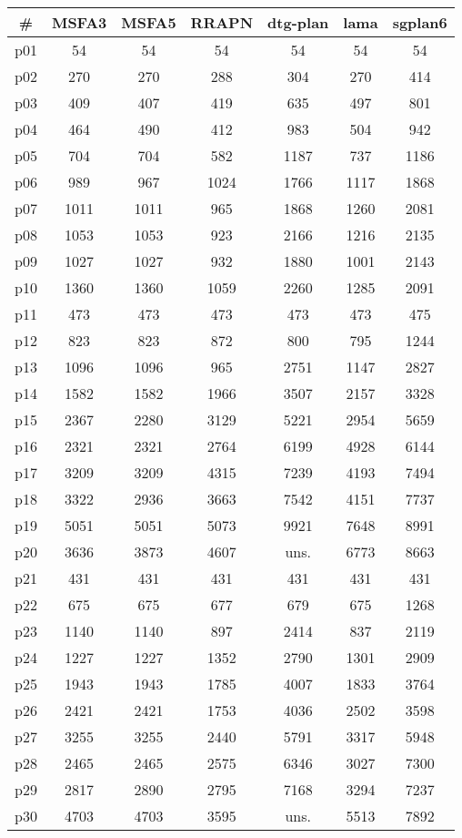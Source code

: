 \begin{tabular}{ccccccc}
\toprule
\textbf{\#} & \textbf{MSFA3} & \textbf{MSFA5} & \textbf{RRAPN} & \textbf{dtg-plan} & \textbf{lama} & \textbf{sgplan6}\\
\midrule
p01 & 54 & 54 & 54 & 54 & 54 & 54\\
p02 & 270 & 270 & 288 & 304 & 270 & 414\\
p03 & 409 & 407 & 419 & 635 & 497 & 801\\
p04 & 464 & 490 & 412 & 983 & 504 & 942\\
p05 & 704 & 704 & 582 & 1187 & 737 & 1186\\
p06 & 989 & 967 & 1024 & 1766 & 1117 & 1868\\
p07 & 1011 & 1011 & 965 & 1868 & 1260 & 2081\\
p08 & 1053 & 1053 & 923 & 2166 & 1216 & 2135\\
p09 & 1027 & 1027 & 932 & 1880 & 1001 & 2143\\
p10 & 1360 & 1360 & 1059 & 2260 & 1285 & 2091\\
p11 & 473 & 473 & 473 & 473 & 473 & 475\\
p12 & 823 & 823 & 872 & 800 & 795 & 1244\\
p13 & 1096 & 1096 & 965 & 2751 & 1147 & 2827\\
p14 & 1582 & 1582 & 1966 & 3507 & 2157 & 3328\\
p15 & 2367 & 2280 & 3129 & 5221 & 2954 & 5659\\
p16 & 2321 & 2321 & 2764 & 6199 & 4928 & 6144\\
p17 & 3209 & 3209 & 4315 & 7239 & 4193 & 7494\\
p18 & 3322 & 2936 & 3663 & 7542 & 4151 & 7737\\
p19 & 5051 & 5051 & 5073 & 9921 & 7648 & 8991\\
p20 & 3636 & 3873 & 4607 & uns. & 6773 & 8663\\
p21 & 431 & 431 & 431 & 431 & 431 & 431\\
p22 & 675 & 675 & 677 & 679 & 675 & 1268\\
p23 & 1140 & 1140 & 897 & 2414 & 837 & 2119\\
p24 & 1227 & 1227 & 1352 & 2790 & 1301 & 2909\\
p25 & 1943 & 1943 & 1785 & 4007 & 1833 & 3764\\
p26 & 2421 & 2421 & 1753 & 4036 & 2502 & 3598\\
p27 & 3255 & 3255 & 2440 & 5791 & 3317 & 5948\\
p28 & 2465 & 2465 & 2575 & 6346 & 3027 & 7300\\
p29 & 2817 & 2890 & 2795 & 7168 & 3294 & 7237\\
p30 & 4703 & 4703 & 3595 & uns. & 5513 & 7892\\
\bottomrule
\end{tabular}

